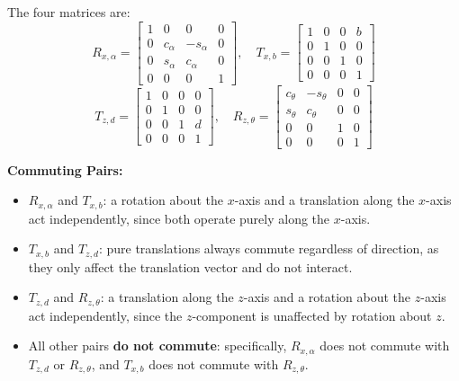 \documentclass[12pt]{article}
\begin{document}
The four matrices are:
\[
R_{x,\alpha} = 
\begin{bmatrix}
    1 &        0 &         0 & 0\\
    0 & c_\alpha & -s_\alpha & 0\\
    0 & s_\alpha &  c_\alpha & 0\\
    0 &        0 &         0 & 1
\end{bmatrix}, 
\quad
T_{x,b} = 
\begin{bmatrix}
    1 & 0 & 0 & b\\
    0 & 1 & 0 & 0\\
    0 & 0 & 1 & 0\\
    0 & 0 & 0 & 1
\end{bmatrix}
\]
\[
T_{z,d} = 
\begin{bmatrix}
    1 & 0 & 0 & 0\\
    0 & 1 & 0 & 0\\
    0 & 0 & 1 & d\\
    0 & 0 & 0 & 1
\end{bmatrix}, 
\quad
R_{z,\theta} = 
\begin{bmatrix}
    c_\theta & -s_\theta & 0 & 0\\
    s_\theta &  c_\theta & 0 & 0\\
           0 &         0 & 1 & 0\\
           0 &         0 & 0 & 1
\end{bmatrix}
\]

\textbf{Commuting Pairs:}

\begin{itemize}
    \item $R_{x,\alpha}$ and $T_{x,b}$: a rotation about
    the $x$-axis and a translation along the $x$-axis act independently,
    since both operate purely along the $x$-axis.
    \item $T_{x,b}$ and $T_{z,d}$: pure translations
    always commute regardless of direction, as they only affect the
    translation vector and do not interact.
    \item $T_{z,d}$ and $R_{z,\theta}$: a translation
    along the $z$-axis and a rotation about the $z$-axis act independently,
    since the $z$-component is unaffected by rotation about $z$.
    \item All other pairs \textbf{do not commute}: specifically,
    $R_{x,\alpha}$ does not commute with $T_{z,d}$ or $R_{z,\theta}$,
    and $T_{x,b}$ does not commute with $R_{z,\theta}$.
\end{itemize}
\end{document}
